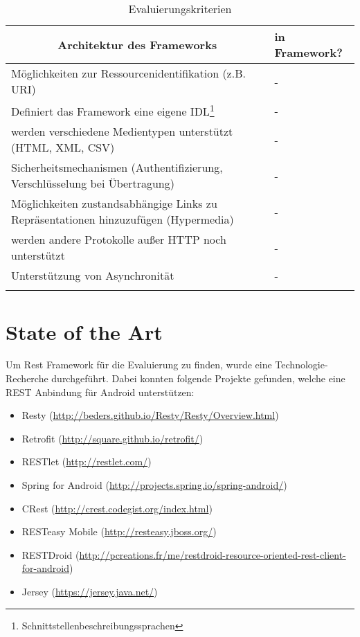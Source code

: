 \documentclass[a4paper,11pt,german,public]{INSOexpose}
\begin{document}
\begin{spacing}{1.4}
\begin{longtable}{|p{.7 \linewidth}|p{.2 \linewidth}|}
	\hline
	\multicolumn{1}{|c|}{\textbf{Architektur des Frameworks}} & \textbf{in Framework?} \\ 
	\hline \hline 
	Möglichkeiten zur Ressourcenidentifikation (z.B. URI) & - \\
	\hline
	Definiert das Framework eine eigene IDL\footnote{Schnittstellenbeschreibungssprachen} & - \\
	\hline 
	werden verschiedene Medientypen unterstützt \newline (HTML, XML, CSV) & - \\
	\hline
	Sicherheitsmechanismen \newline (Authentifizierung, Verschlüsselung bei Übertragung) & - \\
	\hline
	Möglichkeiten zustandsabhängige Links zu Repräsentationen hinzuzufügen (Hypermedia)& - \\
	\hline
	werden andere Protokolle außer HTTP noch unterstützt & - \\
	\hline
	Unterstützung von Asynchronität & - \\
	\hline
	\caption{Evaluierungskriterien}
	\label{tab:tabEvaluierungskriterien}
\end{longtable}
\end{spacing}
\section{State of the Art}
Um Rest Framework für die Evaluierung zu finden, wurde eine Technologie-Recherche durchgeführt. Dabei konnten folgende Projekte gefunden, welche eine REST Anbindung für Android unterstützen:
\begin{itemize}
	\item Resty (\url{http://beders.github.io/Resty/Resty/Overview.html})
	\item Retrofit (\url{http://square.github.io/retrofit/})
	\item RESTlet (\url{http://restlet.com/})
	\item Spring for Android (\url{http://projects.spring.io/spring-android/})
	\item CRest (\url{http://crest.codegist.org/index.html})
	\item RESTeasy Mobile (\url{http://resteasy.jboss.org/})
	\item RESTDroid (\url{http://pcreations.fr/me/restdroid-resource-oriented-rest-client-for-android})
	\item Jersey (\url{https://jersey.java.net/})
\end{itemize}
\end{document}
